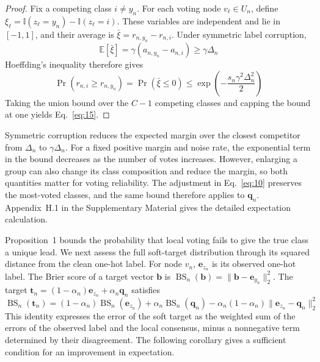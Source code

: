 \documentclass[10pt,letterpaper,nopreprintline]{elsarticle}
\theoremstyle{definition}
\theoremstyle{plain}
\begin{document}
\begin{proof}
\renewcommand{\qedsymbol}{}
Fix a competing class \(i\ne y_n\). For each voting node \(v_\ell\in U_n\), define \(\xi_\ell=\mathbb I(z_\ell=y_n)-\mathbb I(z_\ell=i)\). These variables are independent and lie in \([-1,1]\), and their average is \(\bar\xi=r_{n,y_n}-r_{n,i}\). Under symmetric label corruption,
\[
\mathbb E[\bar\xi]=\gamma(a_{n,y_n}-a_{n,i})\geq\gamma\Delta_n
\]
Hoeffding's inequality \cite{hoeffding1963} therefore gives
\[
\Pr\!\left(r_{n,i}\geq r_{n,y_n}\right)=\Pr(\bar\xi\leq0)
\leq\exp\!\left(-\frac{s_n\gamma^2\Delta_n^2}{2}\right)
\]
Taking the union bound over the \(C-1\) competing classes and capping the bound at one yields Eq.~\eqref{eq:15}.
\end{proof}

Symmetric corruption reduces the expected margin over the closest competitor from \(\Delta_n\) to \(\gamma\Delta_n\). For a fixed positive margin and noise rate, the exponential term in the bound decreases as the number of votes increases. However, enlarging a group can also change its class composition and reduce the margin, so both quantities matter for voting reliability. The adjustment in Eq.~\eqref{eq:10} preserves the most-voted classes, and the same bound therefore applies to \(\mathbf q_n\). Appendix~H.1 in the Supplementary Material gives the detailed expectation calculation.

\Needspace{100pt}
Proposition~1 bounds the probability that local voting fails to give the true class a unique lead. We next assess the full soft-target distribution through its squared distance from the clean one-hot label. For node \(v_n\), \(\mathbf e_{z_n}\) is its observed one-hot label. The Brier score of a target vector \(\mathbf b\) is \(\operatorname{BS}_n(\mathbf b)=\|\mathbf b-\mathbf e_{y_n}\|_2^2\). The target \(\mathbf t_n=(1-\alpha_n)\mathbf e_{z_n}+\alpha_n\mathbf q_n\) satisfies
\begin{equation}\label{eq:16}
\operatorname{BS}_n(\mathbf t_n)=(1-\alpha_n)\operatorname{BS}_n(\mathbf e_{z_n})+\alpha_n\operatorname{BS}_n(\mathbf q_n)-\alpha_n(1-\alpha_n)\|\mathbf e_{z_n}-\mathbf q_n\|_2^2
\end{equation}
This identity expresses the error of the soft target as the weighted sum of the errors of the observed label and the local consensus, minus a nonnegative term determined by their disagreement. The following corollary gives a sufficient condition for an improvement in expectation.
\end{document}
